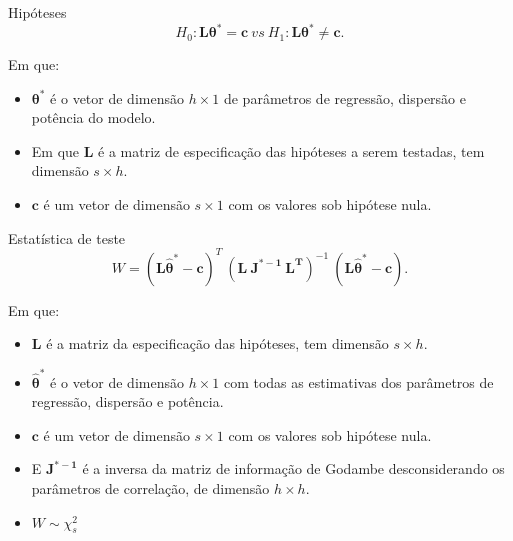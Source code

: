 \documentclass[
  ignorenonframetext,
  serif,
  professionalfont,
  usenames,
  dvipsnames,
  aspectratio = 169]{beamer}
\begin{document}
\begin{frame}{Hipóteses}
\protect\hypertarget{hipuxf3teses}{}
\[H_0: \boldsymbol{L}\boldsymbol{\theta^{*}} = \boldsymbol{c} \ vs \ H_1: \boldsymbol{L}\boldsymbol{\theta^{*}} \neq \boldsymbol{c}.\]

Em que:

\begin{itemize}
  
  \item $\boldsymbol{\theta^{*}}$ é o vetor de dimensão $h \times 1$ de parâmetros de regressão, dispersão e potência do modelo. 
  
  \item Em que $\boldsymbol{L}$ é a matriz de especificação das hipóteses a serem testadas, tem dimensão $s \times h$. 
  
  \item $\boldsymbol{c}$ é um vetor de dimensão $s \times 1$ com os valores sob hipótese nula.

\end{itemize}
\end{frame}

\begin{frame}{Estatística de teste}
\protect\hypertarget{estatuxedstica-de-teste}{}
\[W = (\boldsymbol{L\hat\theta^{*}} - \boldsymbol{c})^T \ (\boldsymbol{L \ J^{\boldsymbol{*}-1} \ L^T})^{-1} \ (\boldsymbol{L\hat\theta^{*}} - \boldsymbol{c}).\]

Em que:

\begin{itemize}
  \item $\boldsymbol{L}$ é a matriz da especificação das hipóteses, tem dimensão $s \times h$. 

  \item $\boldsymbol{\hat\theta^{*}}$ é o vetor de dimensão $h \times 1$ com todas as estimativas dos parâmetros de regressão, dispersão e potência. 

  \item $\boldsymbol{c}$ é um vetor de dimensão $s \times 1$ com os valores sob hipótese nula. 

  \item E $\boldsymbol{J^{\boldsymbol{*}-1}}$ é a inversa da matriz de informação de Godambe desconsiderando os parâmetros de correlação, de dimensão $h \times h$. 
  
  \item $W \sim \chi^2_s$

\end{itemize}
\end{frame}
\end{document}
